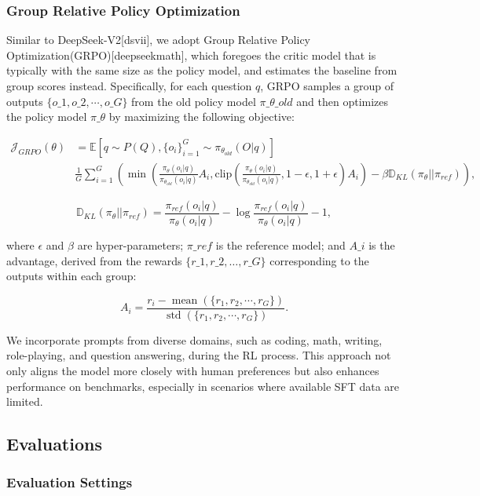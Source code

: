 \documentclass[11pt,a4paper]{article}
\begin{document}
\subsubsection{Group Relative Policy Optimization}

Similar to DeepSeek-V2[dsvii], we adopt Group Relative Policy Optimization(GRPO)[deepseekmath], which foregoes the critic model that is typically with the same size as the policy model, and estimates the baseline from group scores instead. 
Specifically, for each question $q$, GRPO samples a group of outputs $\{o\_1, o\_2, \cdots, o\_G\}$ from the old policy model $\pi\_{\theta\_{old}}$ and then optimizes the policy model $\pi\_{\theta}$ by maximizing the following objective:

$$\begin{split}
    \mathcal{J}_{GRPO}(\theta) &= \mathbb{E}{[q \sim P(Q), \{o_i\}_{i=1}^G \sim \pi_{\theta_{old}}(O|q)]}  \\
    & \frac{1}{G}\sum_{i=1}^G \left( \min \left( \frac{\pi_\theta(o_i |q)}{\pi_{\theta_{old}}(o_i |q)} A_i, \text{clip} \left( \frac{\pi_\theta(o_i |q)}{\pi_{\theta_{old}}(o_i |q)}, 1 - \epsilon, 1 + \epsilon \right)  A_i \right) - \beta \mathbb{D}_{KL}\left(\pi_{\theta} || \pi_{ref}\right)\right) ,
\end{split}$$

$$\mathbb{D}_{KL}\left(\pi_{\theta} || \pi_{ref}\right) = \frac{\pi_{ref}(o_i|q)}{\pi_{\theta}(o_i|q)}- \log\frac{\pi_{ref}(o_i|q)}{\pi_{\theta}(o_i|q)} - 1,$$

where $\epsilon$ and $\beta$ are hyper-parameters; 
$\pi\_{ref}$ is the reference model; 
and $A\_i$ is the advantage, derived from the rewards $\{r\_1, r\_2, \ldots, r\_G\}$ corresponding to the outputs within each group:

$$A_i = \frac{r_i - {\operatorname{mean}(\{r_1, r_2, \cdots, r_G\})}}{{\operatorname{std}(\{r_1, r_2, \cdots, r_G\})}}.$$

We incorporate prompts from diverse domains, such as coding, math, writing, role-playing, and question answering, during the RL process. 
This approach not only aligns the model more closely with human preferences but also enhances performance on benchmarks, especially in scenarios where available SFT data are limited.

\subsection{Evaluations}

\subsubsection{Evaluation Settings}
\end{document}
